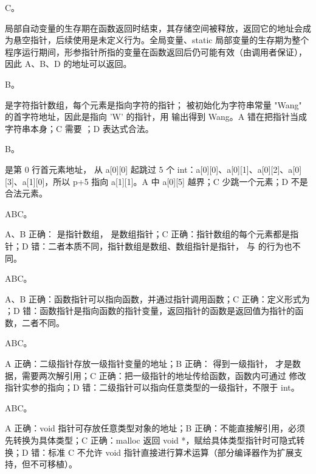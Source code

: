 \documentclass[a4paper,11pt]{article}
\begin{document}
\q C。\begin{analysis}局部自动变量的生存期在函数返回时结束，其存储空间被释放，返回它的地址会成为悬空指针，后续使用是未定义行为。全局变量、static 局部变量的生存期为整个程序运行期间，形参指针所指的变量在函数返回后仍可能有效（由调用者保证），因此 A、B、D 的地址可以返回。\end{analysis}

\q B。\begin{analysis} 是字符指针数组，每个元素是指向字符的指针； 被初始化为字符串常量 "Wang" 的首字符地址，因此是指向 'W' 的指针，用  输出得到 Wang。A 错在把指针当成字符串本身；C 需要 ；D 表达式合法。\end{analysis}

\q B。\begin{analysis} 是第 0 行首元素地址， 从 a[0][0] 起跳过 5 个 int：a[0][0]、a[0][1]、a[0][2]、a[0][3]、a[1][0]，所以 p+5 指向 a[1][1]。A 中 a[0][5] 越界；C 少跳一个元素；D 不是合法元素。\end{analysis}


\q ABC。\begin{analysis}A、B 正确： 是指针数组， 是数组指针；C 正确：指针数组的每个元素都是指针；D 错：二者本质不同，指针数组是数组、数组指针是指针， 与  的行为也不同。\end{analysis}

\q ABC。\begin{analysis}A、B 正确：函数指针可以指向函数，并通过指针调用函数；C 正确：定义形式为 ；D 错：函数指针是指向函数的指针变量，返回指针的函数是返回值为指针的函数，二者不同。\end{analysis}

\q ABC。\begin{analysis}A 正确：二级指针存放一级指针变量的地址；B 正确： 得到一级指针， 才是数据，需要两次解引用；C 正确：把一级指针的地址传给函数，函数内可通过  修改指针实参的指向；D 错：二级指针可以指向任意类型的一级指针，不限于 int。\end{analysis}

\q ABC。\begin{analysis}A 正确：void 指针可存放任意类型对象的地址；B 正确：不能直接解引用，必须先转换为具体类型；C 正确：malloc 返回 void *，赋给具体类型指针时可隐式转换；D 错：标准 C 不允许 void 指针直接进行算术运算（部分编译器作为扩展支持，但不可移植）。\end{analysis}
\end{document}

